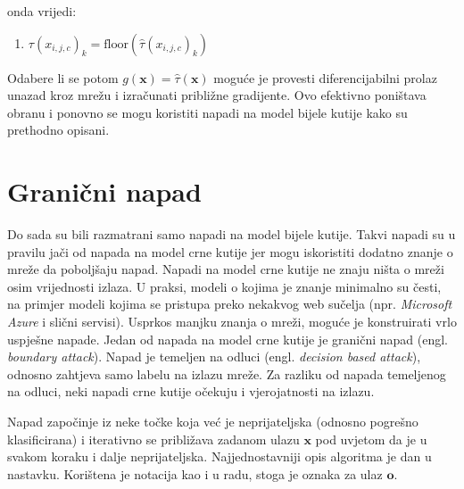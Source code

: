 \documentclass[utf8, diplomski]{fer}
\begin{document}
onda vrijedi:
\begin{enumerate}[topsep=0pt,parsep=0pt,partopsep=0pt, label={}]
	\item $\tau (x_{i, j, c})_{k} = \text{floor}(\hat{\tau}(x_{i,j,c})_{k})$
\end{enumerate}

Odabere li se potom $g(\boldsymbol{x}) = \hat{\tau}(\boldsymbol{x})$ moguće je provesti diferencijabilni prolaz unazad kroz mrežu i izračunati približne gradijente. Ovo efektivno poništava obranu i ponovno se mogu koristiti napadi na model bijele kutije kako su prethodno opisani. 

\section{Granični napad} Do sada su bili razmatrani samo napadi na model bijele kutije. Takvi napadi su u pravilu jači od napada na model crne kutije jer mogu iskoristiti dodatno znanje o mreže da poboljšaju napad. Napadi na model crne kutije ne znaju ništa o mreži osim vrijednosti izlaza. U praksi, modeli o kojima je znanje minimalno su česti, na primjer modeli kojima se pristupa preko nekakvog web sučelja (npr. \textit{Microsoft Azure} i slični servisi). Usprkos manjku znanja o mreži, moguće je konstruirati vrlo uspješne napade.
Jedan od napada na model crne kutije je granični napad (engl. \textit{boundary attack}). Napad je temeljen na odluci (engl. \textit{decision based attack}), odnosno zahtjeva samo labelu na izlazu mreže. Za razliku od napada temeljenog na odluci, neki napadi crne kutije očekuju i vjerojatnosti na izlazu. \par
Napad započinje iz neke točke koja već je neprijateljska (odnosno pogrešno klasificirana) i iterativno se približava zadanom ulazu $\boldsymbol{x}$ pod uvjetom da je u svakom koraku i dalje neprijateljska. Najjednostavniji opis algoritma je dan u nastavku. Korištena je notacija kao i u radu, stoga je oznaka za ulaz $\boldsymbol{o}$.
\end{document}
